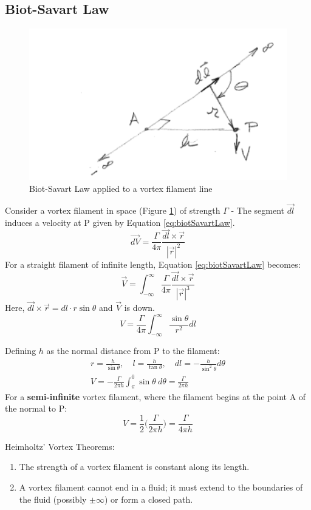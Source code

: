 \documentclass[draft=false, titlepage]{article}
\begin{document}
\subsection{Biot-Savart Law}
\begin{figure}[ht]
    \centering
    \includegraphics[width=0.4\linewidth]{Figures/vortexFilamentLine.PNG}
    \caption{Biot-Savart Law applied to a vortex filament line}
    \label{fig:vortexFilamentLine}
\end{figure}
Consider a vortex filament in space (Figure \ref{fig:vortexFilamentLine}) of strength $\Gamma$ - The segment $\vec{dl}$ induces a velocity at P given by Equation \ref{eq:biotSavartLaw}.
\begin{equation}
    \vec{dV} = \frac{\Gamma}{4\pi} \frac{\vec{dl}\times\vec{r}}{|\vec{r}|^2}
    \label{eq:biotSavartLaw}
\end{equation}
For a straight filament of infinite length, Equation \ref{eq:biotSavartLaw} becomes:
\begin{equation*}
    \vec{V} = \int_{-\infty}^\infty \frac{\Gamma}{4\pi} \frac{\vec{dl}\times\vec{r}}{|\vec{r}|^3}
\end{equation*}
Here, $\vec{dl}\times\vec{r} = dl\cdot r \sin\theta$ and $\vec{V}$ is down.
\begin{equation*}
    V = \frac{\Gamma}{4\pi} \int_{-\infty}^\infty \frac{\sin\theta}{r^2}dl
\end{equation*}

Defining $h$ as the normal distance from P to the filament:
\begin{gather*}
    r = \frac{h}{\sin\theta},\quad l = \frac{h}{\tan\theta},\quad dl = -\frac{h}{\sin^2\theta}d\theta\\
    V = -\frac{\Gamma}{2\pi h} \int_\pi^0 \sin\theta\ d\theta = \frac{\Gamma}{2\pi h}
\end{gather*}
For a \textbf{semi-infinite} vortex filament, where the filament begins at the point A of the normal to P:
\begin{equation*}
    V = \frac{1}{2}\Big( \frac{\Gamma}{2\pi h} \Big)  = \frac{\Gamma}{4\pi h}
\end{equation*}

Heimholtz' Vortex Theorems:
\begin{enumerate}
    \item The strength of a vortex filament is constant along its length.
    \item A vortex filament cannot end in a fluid; it must extend to the boundaries of the fluid (possibly $\pm \infty$) or form a closed path.
\end{enumerate}
\end{document}
